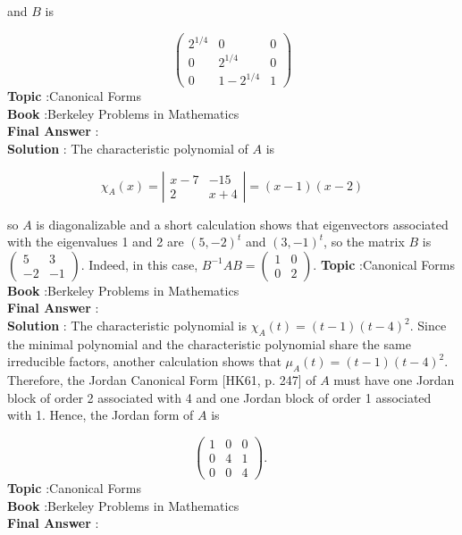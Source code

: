 \documentclass[10pt]{article}
\begin{document}
and $B$ is

$$
\left(\begin{array}{ccc}
2^{1 / 4} & 0 & 0 \\
0 & 2^{1 / 4} & 0 \\
0 & 1-2^{1 / 4} & 1
\end{array}\right)
$$
\textbf{Topic} :Canonical Forms \\
\textbf{Book} :Berkeley Problems in Mathematics\\
\textbf{Final Answer} :\\


\textbf{Solution} : The characteristic polynomial of $A$ is

$$
\chi_{A}(x)=\left|\begin{array}{cc}
x-7 & -15 \\
2 & x+4
\end{array}\right|=(x-1)(x-2)
$$

so $A$ is diagonalizable and a short calculation shows that eigenvectors associated with the eigenvalues 1 and 2 are $(5,-2)^{t}$ and $(3,-1)^{t}$, so the matrix $B$ is $\left(\begin{array}{cc}5 & 3 \\ -2 & -1\end{array}\right)$. Indeed, in this case, $B^{-1} A B=\left(\begin{array}{ll}1 & 0 \\ 0 & 2\end{array}\right)$.
\textbf{Topic} :Canonical Forms \\
\textbf{Book} :Berkeley Problems in Mathematics\\
\textbf{Final Answer} :\\


\textbf{Solution} : The characteristic polynomial is $\chi_{A}(t)=(t-1)(t-4)^{2}$. Since the minimal polynomial and the characteristic polynomial share the same irreducible factors, another calculation shows that $\mu_{A}(t)=(t-1)(t-4)^{2}$. Therefore, the Jordan Canonical Form [HK61, p. 247] of $A$ must have one Jordan block of order 2 associated with 4 and one Jordan block of order 1 associated with 1. Hence, the Jordan form of $A$ is

$$
\left(\begin{array}{lll}
1 & 0 & 0 \\
0 & 4 & 1 \\
0 & 0 & 4
\end{array}\right) \text {. }
$$
\textbf{Topic} :Canonical Forms \\
\textbf{Book} :Berkeley Problems in Mathematics\\
\textbf{Final Answer} :\\
\end{document}
